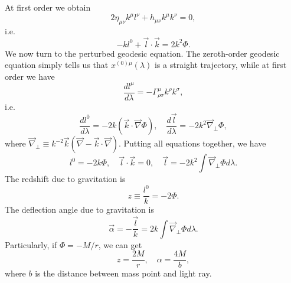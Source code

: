 At first order we obtain
\[2\eta_{\mu\nu}k^{\mu}l^{\nu} + h_{\mu\nu}k^{\mu}k^{\nu} = 0,\]
i.e.
\[-k l^0 + \vec{l}\cdot\vec{k} = 2k^2\Phi.\]
We now turn to the perturbed geodesic equation. The zeroth-order geodesic equation simply tells us that $x^{(0)\mu}(\lambda)$ is a straight  trajectory, while at first order we have
\[\frac{dl^{\mu}}{d\lambda} = -\Gamma^{\mu}_{\rho\sigma}k^{\rho}k^{\sigma},\]
i.e.
\[\frac{dl^0}{d\lambda} = -2k(\vec{k}\cdot\vec{\nabla}\Phi), \quad \frac{d\vec{l}}{d\lambda} = -2k^2\vec{\nabla}_{\bot}\Phi,\]
where $\vec{\nabla}_{\bot} \equiv k^{-2}\vec{k}(\vec{\nabla} - \vec{k}\cdot\vec{\nabla})$.
Putting all equations together, we have
\[l^0 = -2k \Phi, \quad \vec{l} \cdot \vec{k} = 0, \quad \vec{l} = -2k^2 \int \vec{\nabla}_{\bot}\Phi d\lambda.\] 
The redshift due to gravitation is
\[z \equiv \frac{l^0}{k} = -2\Phi.\]
The deflection angle due to gravitation is
\[\vec{\alpha} = -\frac{\vec{l}}{k} = 2k\int \vec{\nabla}_{\bot}\Phi d\lambda.\]
Particularly, if $\Phi = -M/r$, we can get
\[z = \frac{2M}{r}, \quad \alpha = \frac{4M}{b},\]
where $b$ is the distance between mass point and light ray.

